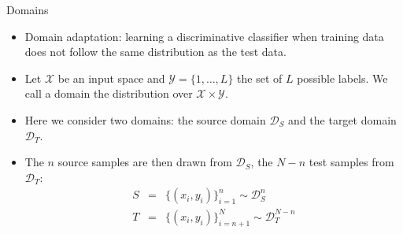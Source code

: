\documentclass[xcolor=pdftex,dvipsnames,table]{beamer}
\begin{document}


\begin{frame}{Domains}
\begin{itemize}
\item Domain adaptation: learning a discriminative classifier when training data does not follow the same distribution as the test data.
\item Let $\mathcal{X}$ be an input space and $\mathcal{Y} = \{ 1, \ldots, L\}$ the set of $L$ possible labels. We call a domain the distribution over $\mathcal{X} \times \mathcal{Y}$. 
\item Here we consider two domains: the source domain $\mathcal{D}_S$ and the target domain $\mathcal{D}_T$. 
\item The $n$ source samples are then drawn from $\mathcal{D}_S$, the $N-n$ test samples from $\mathcal{D}_T$: 
\begin{eqnarray}
S &=& \{(x_i, y_i)\}_{i=1}^n \sim \mathcal{D}_S^n \nonumber \\
T &=& \{(x_i, y_i)\}_{i=n+1}^N \sim \mathcal{D}^{N-n}_T \nonumber 
\end{eqnarray}
\end{itemize}
\end{frame}
\end{document}
